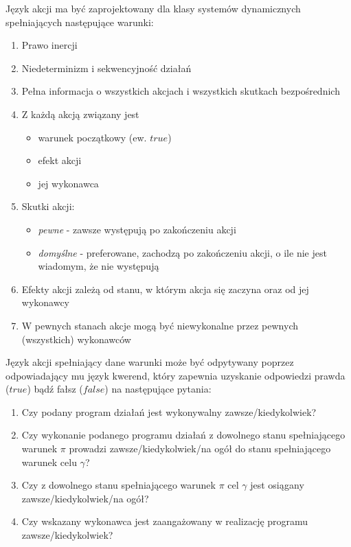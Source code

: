 \documentclass[11pt,a4paper]{article}
\begin{document}
    Język akcji ma być zaprojektowany dla klasy systemów dynamicznych spełniających następujące warunki:
    \begin{enumerate}
        \item Prawo inercji
        \item Niedeterminizm i sekwencyjność działań
        \item Pełna informacja o wszystkich akcjach i wszystkich skutkach bezpośrednich
        \item Z każdą akcją związany jest
            \begin{itemize}
                \item warunek początkowy (ew. $true$)
                \item efekt akcji
                \item jej wykonawca
            \end{itemize}
        \item Skutki akcji:
            \begin{itemize}
                \item \textit{pewne} - zawsze występują po zakończeniu akcji
                \item \textit{domyślne} - preferowane, zachodzą po zakończeniu akcji, o ile nie jest wiadomym, że nie występują
            \end{itemize}
        \item Efekty akcji zależą od stanu, w którym akcja się zaczyna oraz od jej wykonawcy
        \item W pewnych stanach akcje mogą być niewykonalne przez pewnych (wszystkich) wykonawców
    \end{enumerate}
    
    Język akcji spełniający dane warunki może być odpytywany poprzez odpowiadający mu język kwerend, który zapewnia uzyskanie odpowiedzi prawda ($true$) bądź fałsz ($false$) na następujące pytania:
    \begin{enumerate}
        \item Czy podany program działań jest wykonywalny zawsze/kiedykolwiek?
        \item Czy wykonanie podanego programu działań z dowolnego stanu spełniającego warunek $\pi$ prowadzi zawsze/kiedykolwiek/na ogół do stanu spełniającego warunek celu $\gamma$?
        \item Czy z dowolnego stanu spełniającego warunek $\pi$ cel $\gamma$ jest osiągany zawsze/kiedykolwiek/na ogół?
        \item Czy wskazany wykonawca jest zaangażowany w realizację programu zawsze/kiedykolwiek?
    \end{enumerate}
    
\end{document}
